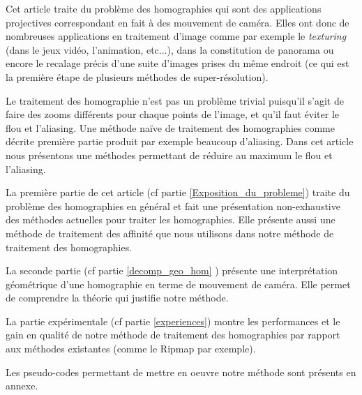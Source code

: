 	Cet article traite du problème des homographies qui sont des applications projectives correspondant en fait à des mouvement de caméra. Elles ont donc de nombreuses applications en traitement d'image comme par exemple le \emph{texturing} (dans le jeux vidéo, l'animation, etc...), dans la constitution de panorama \cite{brown2007automatic} ou encore le recalage précis d'une suite d'images prises du même endroit (ce qui est la première étape de plusieurs méthodes de super-résolution).

	Le traitement des homographie n'est pas un problème trivial puisqu'il s'agit de faire des zooms différents pour chaque points de l'image, et qu'il faut éviter le flou et l'aliasing. Une méthode naïve de traitement des homographies comme décrite première partie produit par exemple beaucoup d'aliasing. Dans cet article nous présentons une méthodes permettant de réduire au maximum le flou et l'aliasing.

	La première partie de cet article (cf partie \ref{Exposition_du_probleme}) traite du problème des homographies en général et fait une présentation non-exhaustive des méthodes actuelles pour traiter les homographies. Elle présente aussi une méthode de traitement des affinité que nous utilisons dans notre méthode de traitement des homographies. 

	La seconde partie (cf partie \ref{decomp_geo_hom} ) présente une interprétation géométrique d'une homographie en terme de mouvement de caméra. Elle permet de comprendre la théorie qui justifie notre méthode.

	La partie expérimentale (cf partie \ref{experiences}) montre les performances et le gain en qualité de notre méthode de traitement des homographies par rapport aux méthodes existantes (comme le Ripmap par exemple).

	Les pseudo-codes permettant de mettre en oeuvre notre méthode sont présents en annexe.
